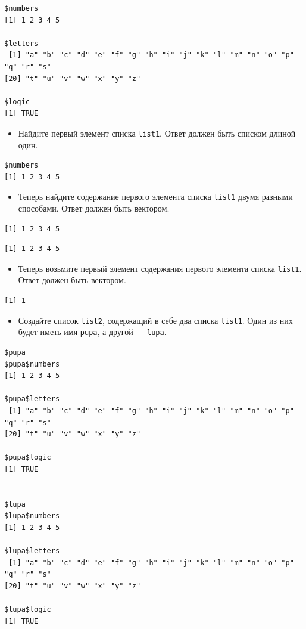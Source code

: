 \documentclass[
]{book}
\providecommand{\tightlist}{%
  \setlength{\itemsep}{0pt}\setlength{\parskip}{0pt}}
\begin{document}
\begin{verbatim}
$numbers
[1] 1 2 3 4 5

$letters
 [1] "a" "b" "c" "d" "e" "f" "g" "h" "i" "j" "k" "l" "m" "n" "o" "p" "q" "r" "s"
[20] "t" "u" "v" "w" "x" "y" "z"

$logic
[1] TRUE
\end{verbatim}

\begin{itemize}
\tightlist
\item
  Найдите первый элемент списка \texttt{list1}. Ответ должен быть списком длиной один.
\end{itemize}

\begin{verbatim}
$numbers
[1] 1 2 3 4 5
\end{verbatim}

\begin{itemize}
\tightlist
\item
  Теперь найдите содержание первого элемента списка \texttt{list1} двумя разными способами. Ответ должен быть вектором.
\end{itemize}

\begin{verbatim}
[1] 1 2 3 4 5
\end{verbatim}

\begin{verbatim}
[1] 1 2 3 4 5
\end{verbatim}

\begin{itemize}
\tightlist
\item
  Теперь возьмите первый элемент содержания первого элемента списка \texttt{list1}. Ответ должен быть вектором.
\end{itemize}

\begin{verbatim}
[1] 1
\end{verbatim}

\begin{itemize}
\tightlist
\item
  Создайте список \texttt{list2}, содержащий в себе два списка \texttt{list1}. Один из них будет иметь имя \texttt{pupa}, а другой --- \texttt{lupa}.
\end{itemize}

\begin{verbatim}
$pupa
$pupa$numbers
[1] 1 2 3 4 5

$pupa$letters
 [1] "a" "b" "c" "d" "e" "f" "g" "h" "i" "j" "k" "l" "m" "n" "o" "p" "q" "r" "s"
[20] "t" "u" "v" "w" "x" "y" "z"

$pupa$logic
[1] TRUE


$lupa
$lupa$numbers
[1] 1 2 3 4 5

$lupa$letters
 [1] "a" "b" "c" "d" "e" "f" "g" "h" "i" "j" "k" "l" "m" "n" "o" "p" "q" "r" "s"
[20] "t" "u" "v" "w" "x" "y" "z"

$lupa$logic
[1] TRUE
\end{verbatim}
\end{document}
